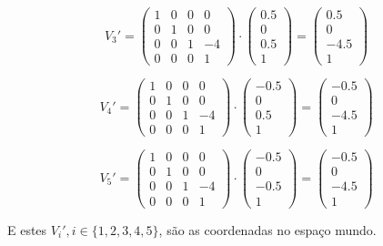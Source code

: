 \documentclass{article}
\begin{document}
$$V_3' = \begin{pmatrix}
1 & 0 & 0 & 0\\
0 & 1 & 0 & 0\\
0 & 0 & 1 & -4\\
0 & 0 & 0 & 1
\end{pmatrix} \cdot \begin{pmatrix}
0.5\\
0\\
0.5\\
1
\end{pmatrix} = \begin{pmatrix}
0.5\\
0\\
-4.5\\
1
\end{pmatrix}$$

$$V_4' = \begin{pmatrix}
1 & 0 & 0 & 0\\
0 & 1 & 0 & 0\\
0 & 0 & 1 & -4\\
0 & 0 & 0 & 1
\end{pmatrix} \cdot \begin{pmatrix}
-0.5\\
0\\
0.5\\
1
\end{pmatrix} = \begin{pmatrix}
-0.5\\
0\\
-4.5\\
1
\end{pmatrix}$$

$$V_5' = \begin{pmatrix}
1 & 0 & 0 & 0\\
0 & 1 & 0 & 0\\
0 & 0 & 1 & -4\\
0 & 0 & 0 & 1
\end{pmatrix} \cdot \begin{pmatrix}
-0.5\\
0\\
-0.5\\
1
\end{pmatrix} = \begin{pmatrix}
-0.5\\
0\\
-4.5\\
1
\end{pmatrix}$$

E estes $V_i', i \in \{1, 2, 3, 4, 5\}$, são as coordenadas no espaço mundo.
\end{document}
